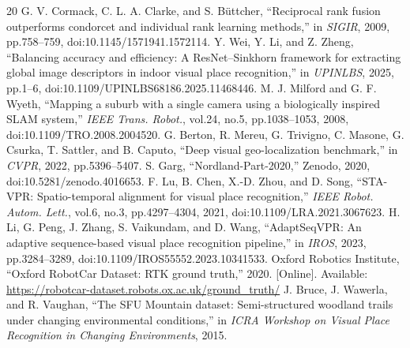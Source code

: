 \documentclass[conference]{IEEEtran}
\begin{document}
\begin{thebibliography}{20}
 G. V. Cormack, C. L. A. Clarke, and S. B\"uttcher, ``Reciprocal rank fusion outperforms condorcet and individual rank learning methods,'' in \emph{SIGIR}, 2009, pp.758--759, doi:10.1145/1571941.1572114.
 Y. Wei, Y. Li, and Z. Zheng, ``Balancing accuracy and efficiency: A ResNet--Sinkhorn framework for extracting global image descriptors in indoor visual place recognition,'' in \emph{UPINLBS}, 2025, pp.1--6, doi:10.1109/UPINLBS68186.2025.11468446.
 M. J. Milford and G. F. Wyeth, ``Mapping a suburb with a single camera using a biologically inspired SLAM system,'' \emph{IEEE Trans. Robot.}, vol.24, no.5, pp.1038--1053, 2008, doi:10.1109/TRO.2008.2004520.
 G. Berton, R. Mereu, G. Trivigno, C. Masone, G. Csurka, T. Sattler, and B. Caputo, ``Deep visual geo-localization benchmark,'' in \emph{CVPR}, 2022, pp.5396--5407.
 S. Garg, ``Nordland-Part-2020,'' Zenodo, 2020, doi:10.5281/zenodo.4016653.
 F. Lu, B. Chen, X.-D. Zhou, and D. Song, ``STA-VPR: Spatio-temporal alignment for visual place recognition,'' \emph{IEEE Robot. Autom. Lett.}, vol.6, no.3, pp.4297--4304, 2021, doi:10.1109/LRA.2021.3067623.
 H. Li, G. Peng, J. Zhang, S. Vaikundam, and D. Wang, ``AdaptSeqVPR: An adaptive sequence-based visual place recognition pipeline,'' in \emph{IROS}, 2023, pp.3284--3289, doi:10.1109/IROS55552.2023.10341533.
 Oxford Robotics Institute, ``Oxford RobotCar Dataset: RTK ground truth,'' 2020. [Online]. Available: \url{https://robotcar-dataset.robots.ox.ac.uk/ground_truth/}
 J. Bruce, J. Wawerla, and R. Vaughan, ``The SFU Mountain dataset: Semi-structured woodland trails under changing environmental conditions,'' in \emph{ICRA Workshop on Visual Place Recognition in Changing Environments}, 2015.

\end{thebibliography}
\end{document}
